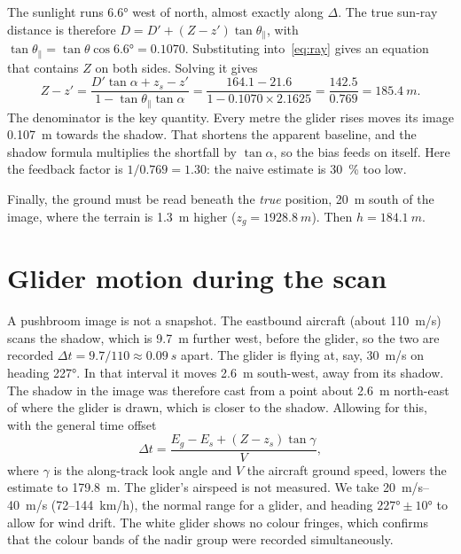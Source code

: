 \documentclass[11pt,a4paper]{article}
\begin{document}
The sunlight runs \ang{6.6} west of north, almost exactly along $\Delta$. The true sun-ray distance
is therefore $D = D' + (Z - z')\tan\theta_\parallel$, with $\tan\theta_\parallel = \tan\theta\cos\ang{6.6} = 0.1070$.
Substituting into~\eqref{eq:ray} gives an equation that contains $Z$ on both sides. Solving it gives
\begin{equation}
  Z - z' = \frac{D'\tan\alpha + z_s - z'}{1 - \tan\theta_\parallel\tan\alpha}
         = \frac{164.1 - 21.6}{1 - 0.1070\times2.1625} = \frac{142.5}{0.769} = \SI{185.4}{m}.
  \label{eq:relief-solved}
\end{equation}
The denominator is the key quantity. Every metre the glider rises moves its image
\SI{0.107}{m} towards the shadow. That shortens the apparent baseline, and the shadow formula multiplies
the shortfall by $\tan\alpha$, so the bias feeds on itself. Here the feedback factor is $1/0.769 = 1.30$: the naive
estimate is \SI{30}{\percent} too low.

Finally, the ground must be read beneath the \emph{true} position, \SI{20}{m} south of the image,
where the terrain is \SI{1.3}{m} higher ($z_g = \SI{1928.8}{m}$). Then $h = \SI{184.1}{m}$.

\section{Glider motion during the scan}\label{sec:motion}

A pushbroom image is not a snapshot. The eastbound aircraft (about \SI{110}{m/s}) scans the shadow, which is
\SI{9.7}{m} further west, before the glider, so the two are recorded
$\Delta t = 9.7/110 \approx \SI{0.09}{s}$ apart. The glider is flying at, say, \SI{30}{m/s} on heading \ang{227}.
In that interval it moves \SI{2.6}{m} south-west, away from its shadow. The shadow in the image was
therefore cast from a point about \SI{2.6}{m} north-east of where the glider is drawn, which is closer to the
shadow. Allowing for this, with the general time offset
\begin{equation}
  \Delta t = \frac{E_g - E_s + (Z - z_s)\tan\gamma}{V},
\end{equation}
where $\gamma$ is the along-track look angle and $V$ the aircraft ground speed,
lowers the estimate to \SI{179.8}{m}. The glider's airspeed is not measured. We take
\SIrange{20}{40}{m/s} (72--\SI{144}{km/h}), the normal range for a glider, and heading
$\ang{227}\pm\ang{10}$ to allow for wind drift. The white glider shows no colour fringes, which confirms
that the colour bands of the nadir group were recorded simultaneously.
\end{document}
